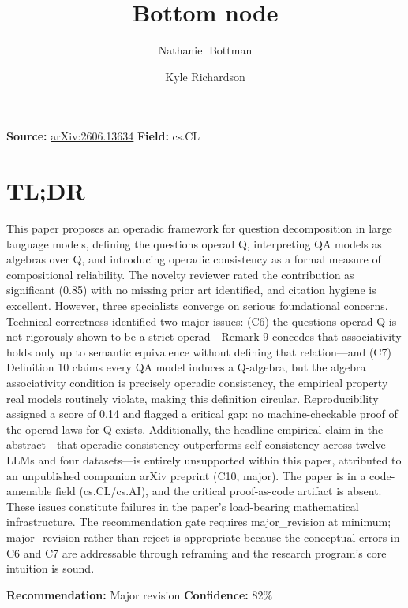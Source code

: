 \documentclass[11pt]{article}
\title{Bottom node}
\author{Nathaniel Bottman \and Kyle Richardson}
\date{}
\begin{document}
\maketitle

\noindent\textbf{Source:} \href{https://arxiv.org/abs/2606.13634}{arXiv:2606.13634} \quad \textbf{Field:} cs.CL\\

\section*{TL;DR}
This paper proposes an operadic framework for question decomposition in large language models, defining the questions operad Q, interpreting QA models as algebras over Q, and introducing operadic consistency as a formal measure of compositional reliability. The novelty reviewer rated the contribution as significant (0.85) with no missing prior art identified, and citation hygiene is excellent. However, three specialists converge on serious foundational concerns. Technical correctness identified two major issues: (C6) the questions operad Q is not rigorously shown to be a strict operad---Remark 9 concedes that associativity holds only up to semantic equivalence without defining that relation---and (C7) Definition 10 claims every QA model induces a Q-algebra, but the algebra associativity condition is precisely operadic consistency, the empirical property real models routinely violate, making this definition circular. Reproducibility assigned a score of 0.14 and flagged a critical gap: no machine-checkable proof of the operad laws for Q exists. Additionally, the headline empirical claim in the abstract---that operadic consistency outperforms self-consistency across twelve LLMs and four datasets---is entirely unsupported within this paper, attributed to an unpublished companion arXiv preprint (C10, major). The paper is in a code-amenable field (cs.CL/cs.AI), and the critical proof-as-code artifact is absent. These issues constitute failures in the paper's load-bearing mathematical infrastructure. The recommendation gate requires major\_revision at minimum; major\_revision rather than reject is appropriate because the conceptual errors in C6 and C7 are addressable through reframing and the research program's core intuition is sound.

\textbf{Recommendation:} Major revision \quad \textbf{Confidence:} 82\%\\
\end{document}
